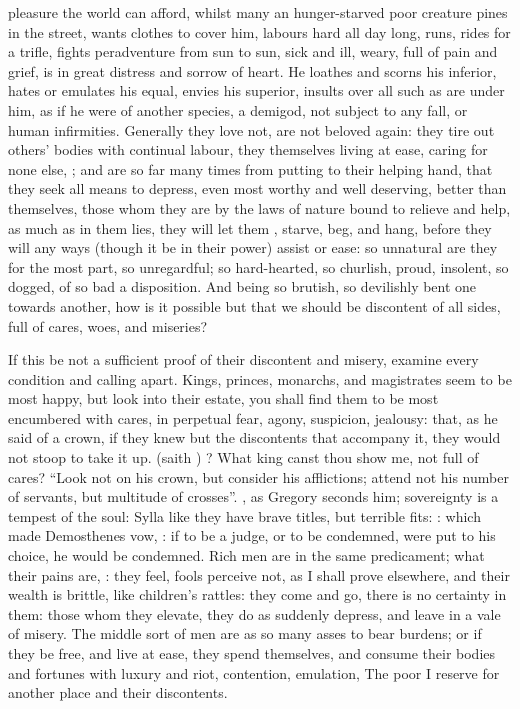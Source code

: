 pleasure the world can afford, whilst many an hunger-starved poor creature
pines in the street, wants clothes to cover him, labours hard all day long,
runs, rides for a trifle, fights peradventure from sun to sun, sick and ill,
weary, full of pain and grief, is in great distress and sorrow of heart. He
loathes and scorns his inferior, hates or emulates his equal, envies his
superior, insults over all such as are under him, as if he were of another
species, a demigod, not subject to any fall, or human infirmities. Generally
they love not, are not beloved again: they tire out others' bodies with
continual labour, they themselves living at ease, caring for none else,
; and are so far many times from putting to their helping hand,
that they seek all means to depress, even most worthy and well deserving,
better than themselves, those whom they are by the laws of nature bound to
relieve and help, as much as in them lies, they will let them , starve, beg, and hang,
before they will any ways (though it be in their power) assist or ease:
so unnatural are they for the most part, so unregardful;
so hard-hearted, so churlish, proud, insolent, so dogged, of so bad a
disposition. And being so brutish, so devilishly bent one towards another, how
is it possible but that we should be discontent of all sides, full of cares,
woes, and miseries?

If this be not a sufficient proof of their discontent and misery, examine every
condition and calling apart. Kings, princes, monarchs, and magistrates seem to
be most happy, but look into their estate, you shall find
them to be most encumbered with cares, in perpetual fear, agony, suspicion,
jealousy: that, as he said of a crown, if they knew but
the discontents that accompany it, they would not stoop to take it up.  (saith \Chrysostom{}) ? What king canst
thou show me, not full of cares? \enquote{Look not on his crown,
but consider his afflictions; attend not his number of servants, but multitude
of crosses}. , as
Gregory seconds him; sovereignty is a tempest of the soul: Sylla like they have
brave titles, but terrible fits: : which
made Demosthenes vow, : if to be a judge, or to be condemned, were put to his
choice, he would be condemned. Rich men are in the same predicament; what their
pains are, : they feel, fools perceive not,
as I shall prove elsewhere, and their wealth is brittle, like children's
rattles: they come and go, there is no certainty in them: those whom they
elevate, they do as suddenly depress, and leave in a vale of misery. The middle
sort of men are as so many asses to bear burdens; or if they be free, and live
at ease, they spend themselves, and consume their bodies and fortunes with
luxury and riot, contention, emulation, \etc{} The poor I reserve for another
place and their discontents.

